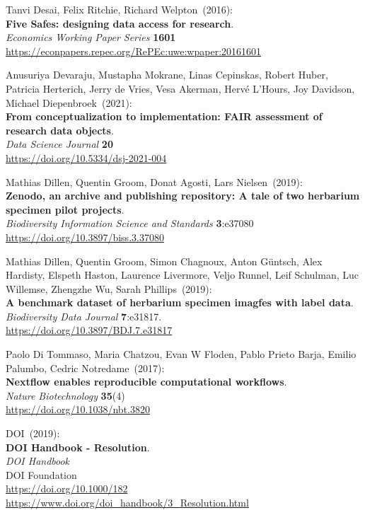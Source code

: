 \begin{thebibliography}{9}
Tanvi Desai, Felix Ritchie, Richard Welpton~(2016): \\
\textbf{Five Safes: designing data access for research}.\\
\emph{Economics Working Paper Series} \textbf{1601}\\
\url{https://econpapers.repec.org/RePEc:uwe:wpaper:20161601}

Anusuriya Devaraju, Mustapha Mokrane, Linas Cepinskas, Robert Huber, Patricia Herterich, Jerry de Vries, Vesa Akerman, Hervé L'Hours, Joy Davidson, Michael Diepenbroek~(2021): \\
\textbf{From conceptualization to implementation: FAIR assessment of research data objects}. \\
\emph{Data Science Journal} \textbf{20} \\
\url{https://doi.org/10.5334/dsj-2021-004}

Mathias Dillen, Quentin Groom, Donat Agosti, Lars Nielsen~(2019): \\
\textbf{Zenodo, an archive and publishing repository: A tale of two herbarium specimen pilot projects}.\\
\emph{Biodiversity Information Science and Standards} \textbf{3}:e37080\\
\url{https://doi.org/10.3897/biss.3.37080}

Mathias Dillen, Quentin Groom, Simon Chagnoux, Anton Güntsch, Alex Hardisty, Elspeth Haston, Laurence Livermore, Veljo Runnel, Leif Schulman, Luc Willemse, Zhengzhe Wu, Sarah Phillips~(2019): \\
\textbf{A benchmark dataset of herbarium specimen imagfes with label data}.\\
\emph{Biodiversity Data Journal} \textbf{7}:e31817.\\
\url{https://doi.org/10.3897/BDJ.7.e31817}

Paolo Di Tommaso, Maria Chatzou, Evan W Floden, Pablo Prieto Barja, Emilio Palumbo, Cedric Notredame~(2017): \\
\textbf{Nextflow enables reproducible computational workflows}.\\
\emph{Nature Biotechnology} \textbf{35}(4) \\
\url{https://doi.org/10.1038/nbt.3820}

DOI~(2019): \\
\textbf{{DOI Handbook} - {Resolution}}. \\
\emph{{DOI Handbook}}\\
DOI Foundation\\
\url{https://doi.org/10.1000/182}\\
\url{https://www.doi.org/doi_handbook/3_Resolution.html}


\end{thebibliography}
